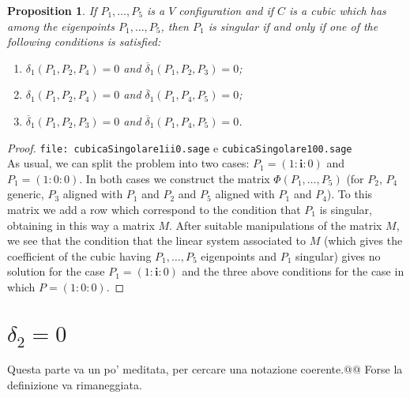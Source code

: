 \documentclass[11pt, a4paper, reqno, captions=tableheading,bibliography=totoc]{scrartcl}
\theoremstyle{plain}
\newtheorem{prop}[lemma]{Proposition}
\theoremstyle{definition}
\newcommand{\iii}{\textbf{i}}
\begin{document}
\begin{prop}
\label{proposition:P1_sing}
If $P_1, \dots, P_5$ is a $V$ configuration and if $C$ is a cubic which
has among the eigenpoints $P_1, \dots, P_5$, then $P_1$ is singular if
and only if one of the following conditions is satisfied:
\begin{enumerate}
\item $\delta_1(P_1, P_2, P_4) = 0$ and $\overline{\delta}_1(P_1, P_2, P_3) = 0$;
\item $\delta_1(P_1, P_2, P_4) = 0$ and $\overline{\delta}_1(P_1, P_4, P_5) = 0$;
\item $\overline{\delta}_1(P_1, P_2, P_3) = 0$ and
$\overline{\delta}_1(P_1, P_4, P_5) = 0$.
\end{enumerate}
\end{prop}
\begin{proof}
\verb+file: cubicaSingolare1ii0.sage+ e \verb+cubicaSingolare100.sage+\\
As usual, we can split the problem into two cases: $P_1 = (1: \iii: 0)$
and $P_1 = (1: 0: 0)$. In both cases we construct the matrix
$\Phi(P_1, \dots, P_5)$ (for $P_2$, $P_4$ generic, $P_3$ aligned with
$P_1$ and $P_2$ and $P_5$ aligned with $P_1$ and $P_4$). To this matrix we add
a row which correspond to the condition that $P_1$ is singular, obtaining
in this way a matrix $M$. After
suitable manipulations of the matrix $M$, we see that the condition that
the linear system associated to $M$ (which gives the coefficient of the cubic
having $P_1, \dots, P_5$ eigenpoints and $P_1$ singular) gives no solution
for the case $P_1=(1: \iii: 0)$ and the three above conditions for the
case in which $P = (1: 0: 0)$.
\end{proof}

\section{$\delta_2=0$}
\label{sezione_delta_2}

Questa parte va un po' meditata, per cercare una notazione coerente.@@
Forse la definizione  va rimaneggiata.
\end{document}
